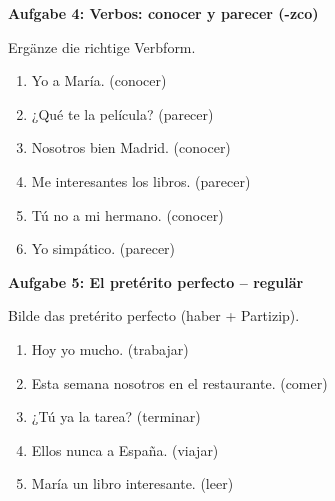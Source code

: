 \documentclass[a4paper,11pt]{article}
\newcommand{\luecke}[1]{\underline{\hspace{#1}}}
\newcommand{\punktebox}[1]{\hfill\fbox{\small\textcolor{mittelgrau}{\_\_\_\,/\,#1}}}
\newenvironment{aufgabe}[2]{%
    \vspace{3mm}
    \noindent\textbf{\color{spanisch}Aufgabe #1: #2}
    \vspace{1mm}
    \par
}{\vspace{2mm}}
\begin{document}
\begin{aufgabe}{4}{Verbos: conocer y parecer (-zco) \punktebox{6}}

Ergänze die richtige Verbform.

\vspace{2mm}
\begin{enumerate}[itemsep=2mm]
    \item Yo \luecke{2.5cm} a María. (conocer)
    \item ¿Qué te \luecke{2.5cm} la película? (parecer)
    \item Nosotros \luecke{2.5cm} bien Madrid. (conocer)
    \item Me \luecke{2.5cm} interesantes los libros. (parecer)
    \item Tú no \luecke{2.5cm} a mi hermano. (conocer)
    \item Yo \luecke{2.5cm} simpático. (parecer)
\end{enumerate}
\end{aufgabe}


\begin{aufgabe}{5}{El pretérito perfecto -- regulär \punktebox{5}}

Bilde das pretérito perfecto (haber + Partizip).

\vspace{2mm}
\begin{enumerate}[itemsep=2mm]
    \item Hoy yo \luecke{3.5cm} mucho. (trabajar)
    \item Esta semana nosotros \luecke{3.5cm} en el restaurante. (comer)
    \item ¿Tú ya \luecke{3.5cm} la tarea? (terminar)
    \item Ellos nunca \luecke{3.5cm} a España. (viajar)
    \item María \luecke{3.5cm} un libro interesante. (leer)
\end{enumerate}
\end{aufgabe}

\end{document}
